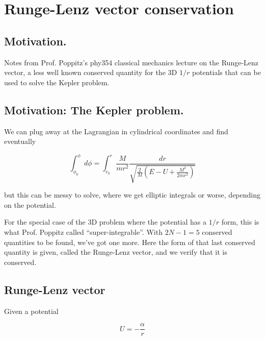 
%

\chapter{Runge-Lenz vector conservation}
\label{chap:RungeLenz}
{}
\date{Feb 11, 2012}

\beginArtWithToc

\section{Motivation.}

Notes from Prof. Poppitz's phy354 classical mechanics lecture on the Runge-Lenz vector, a less well known conserved quantity for the 3D $1/r$ potentials that can be used to solve the Kepler problem.

\section{Motivation: The Kepler problem.}

We can plug away at the Lagrangian in cylindrical coordinates and find eventually

\begin{equation}\label{eqn:RungeLenz:10}
\int_{\phi_0}^\phi d\phi = \int_{r_0}^r \frac{M}{m r^2} \frac{dr}{\sqrt{\frac{2}{M} ( E - U + \frac{M^2}{2 m r^2}) }}
\end{equation}

but this can be messy to solve, where we get elliptic integrals or worse, depending on the potential.

For the special case of the 3D problem where the potential has a $1/r$ form, this is what Prof. Poppitz called ``super-integrable''.  With $2N - 1 = 5$ conserved quantities to be found, we've got one more.  Here the form of that last conserved quantity is given, called the Runge-Lenz vector, and we verify that it is conserved.

\section{Runge-Lenz vector}

Given a potential

\begin{equation}\label{eqn:RungeLenz:30}
U = -\frac{\alpha}{r}
\end{equation}

